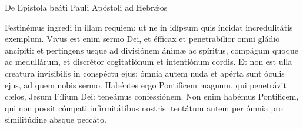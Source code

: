 
De Epistola beáti Pauli Apóstoli ad Hebr\'{\ae}os

Festinémus íngredi in illam requiem: ut ne in idípsum quis íncidat incredulitátis exemplum.
Vivus est enim sermo Dei, et éfficax et penetrabílior omni gládio ancípiti: et pertingens usque ad divisiónem ánimæ ac spíritus, compágum quoque ac medullárum, et discrétor cogitatiónum et intentiónum cordis.
Et non est ulla creatura invisibilis in conspéctu ejus: ómnia autem nuda et apérta sunt óculis ejus, ad quem nobis sermo.
Habéntes ergo Pontificem magnum, qui penetrávit cælos, Jesum Fílium Dei: teneámus confessiónem.
Non enim habémus Pontificem, qui non possit cómpati infirmitátibus nostris: tentátum autem per ómnia pro similitúdine absque peccáto.
\par